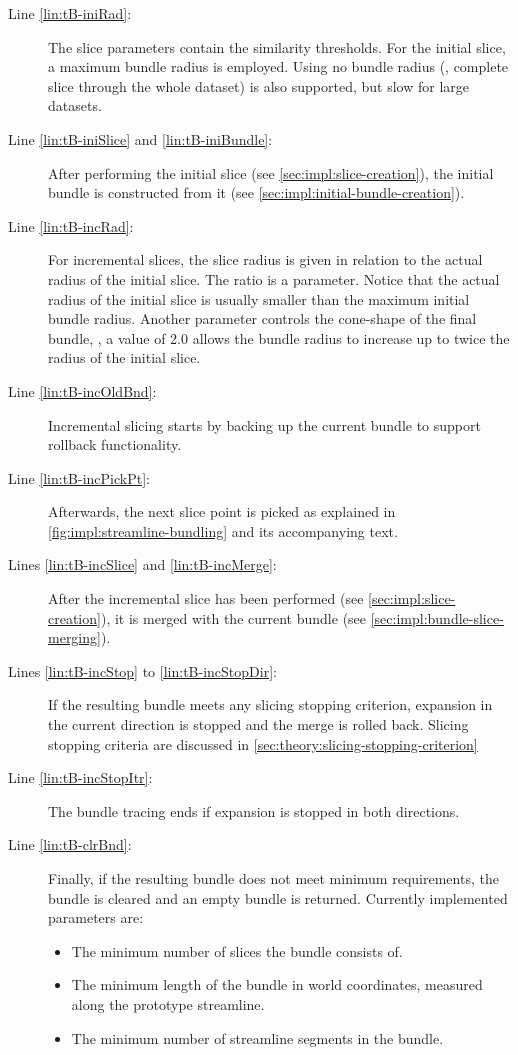 \begin{description}
%
	\item[Line \ref{lin:tB-iniRad}:] The slice parameters contain the similarity thresholds. For the initial slice, a maximum bundle radius is employed. Using no bundle radius (\ie, complete slice through the whole dataset) is also supported, but slow for large datasets.
%
	\item[Line \ref{lin:tB-iniSlice} and \ref{lin:tB-iniBundle}:] After performing the initial slice (see \autoref{sec:impl:slice-creation}), the initial bundle is constructed from it (see \autoref{sec:impl:initial-bundle-creation}).
%
	\item[Line \ref{lin:tB-incRad}:] For incremental slices, the slice radius is given in relation to the actual radius of the initial slice. The ratio is a parameter. Notice that the actual radius of the initial slice is usually smaller than the maximum initial bundle radius.
Another parameter controls the cone-shape of the final bundle, \eg, a value of \num{2.0} allows the bundle radius to increase up to twice the radius of the initial slice. 
%
	\item[Line \ref{lin:tB-incOldBnd}:] Incremental slicing starts by backing up the current bundle to support rollback functionality.
%
	\item[Line \ref{lin:tB-incPickPt}:] Afterwards, the next slice point is picked as explained in \autoref{fig:impl:streamline-bundling} and its accompanying text. 
%
	\item[Lines \ref{lin:tB-incSlice} and \ref{lin:tB-incMerge}:] After the incremental slice has been performed (see \autoref{sec:impl:slice-creation}), it is merged with the current bundle (see \autoref{sec:impl:bundle-slice-merging}).
%
	\item[Lines \ref{lin:tB-incStop} to \ref{lin:tB-incStopDir}:] If the resulting bundle meets any slicing stopping criterion, expansion in the current direction is stopped and the merge is rolled back. Slicing stopping criteria are discussed in \autoref{sec:theory:slicing-stopping-criterion}
%
	\item[Line \ref{lin:tB-incStopItr}:] The bundle tracing ends if expansion is stopped in both directions.
%
	\item[Line \ref{lin:tB-clrBnd}:] Finally, if the resulting bundle does not meet minimum requirements, the bundle is cleared and an empty bundle is returned. Currently implemented parameters are:
	\begin{itemize}
		\item The minimum number of slices the bundle consists of.
		\item The minimum length of the bundle in world coordinates, measured along the prototype streamline.
		\item The minimum number of streamline segments in the bundle.
	\end{itemize}
%
\end{description}

